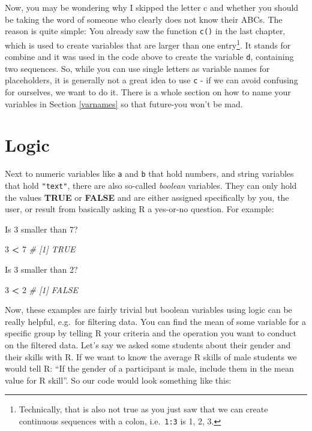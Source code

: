 \documentclass[
]{book}
\newenvironment{Shaded}{\begin{snugshade}}{\end{snugshade}}
\newcommand{\CommentTok}[1]{\textcolor[rgb]{0.56,0.35,0.01}{\textit{#1}}}
\newcommand{\DecValTok}[1]{\textcolor[rgb]{0.00,0.00,0.81}{#1}}
\newcommand{\SpecialCharTok}[1]{\textcolor[rgb]{0.81,0.36,0.00}{\textbf{#1}}}
\begin{document}
Now, you may be wondering why I skipped the letter c and whether you should be taking the word of someone who clearly does not know their ABCs.
The reason is quite simple: You already saw the function \texttt{c()} in the last chapter, which is used to create variables that are larger than one entry\footnote{Technically, that is also not true as you just saw that we can create continuous sequences with a colon, i.e.~\texttt{1:3} is 1, 2, 3.}.
It stands for combine and it was used in the code above to create the variable \texttt{d}, containing two sequences.
So, while you can use single letters as variable names for placeholders, it is generally not a great idea to use \texttt{c} - if we can avoid confusing for ourselves, we want to do it.
There is a whole section on how to name your variables in Section \ref{varnames} so that future-you won't be mad.

\section{Logic}\label{logic}

Next to numeric variables like \texttt{a} and \texttt{b} that hold numbers, and string variables that hold \texttt{"text"}, there are also so-called \emph{boolean} variables.
They can only hold the values \textbf{TRUE} or \textbf{FALSE} and are either assigned specifically by you, the user, or result from basically asking R a yes-or-no question.
For example:

Is 3 smaller than 7?

\begin{Shaded}
\begin{Highlighting}[]
\DecValTok{3} \SpecialCharTok{\textless{}} \DecValTok{7}
\CommentTok{\# [1] TRUE}
\end{Highlighting}
\end{Shaded}

Is 3 smaller than 2?

\begin{Shaded}
\begin{Highlighting}[]
\DecValTok{3} \SpecialCharTok{\textless{}} \DecValTok{2}
\CommentTok{\# [1] FALSE}
\end{Highlighting}
\end{Shaded}

Now, these examples are fairly trivial but boolean variables using logic can be really helpful, e.g.~for filtering data.
You can find the mean of some variable for a specific group by telling R your criteria and the operation you want to conduct on the filtered data.
Let's say we asked some students about their gender and their skills with R.
If we want to know the average R skills of male students we would tell R: ``If the gender of a participant is male, include them in the mean value for R skill''.
So our code would look something like this:
\end{document}
